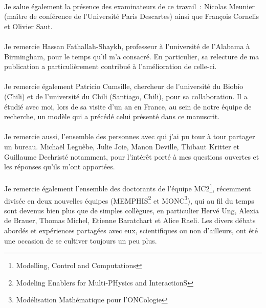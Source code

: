 \paragraph{}
Je salue également la présence des examinateurs de ce travail~: Nicolas Meunier (maître de conférence de l'Université Paris Descartes) ainsi que François Cornelis et Olivier Saut. 


\paragraph{}
Je remercie Hassan Fathallah-Shaykh, professeur à l'université de l'Alabama à Birmingham, pour le temps qu'il m'a consacré. En particulier, sa relecture de ma publication a particulièrement contribué à l'amélioration de celle-ci.

\paragraph{}
Je remercie également Patricio Cumsille, chercheur de l'université du Biobío (Chili) et de l'université du Chili (Santiago, Chili), pour sa collaboration. Il a étudié avec moi, lors de sa visite d'un an en France, au sein de notre équipe de recherche, un modèle qui a précédé celui présenté dans ce manuscrit. 

\paragraph{}
Je remercie aussi, l'ensemble des personnes avec qui j'ai pu tour à tour partager un bureau. Michaël Leguèbe, Julie Joie, Manon Deville, Thibaut Kritter et Guillaume Dechristé notamment, pour l'intérêt porté à mes questions ouvertes et les réponses qu'ils m'ont apportées. 

\paragraph{}
Je remercie également l'ensemble des doctorants de l'équipe MC2\footnote{Modelling, Control and Computations}, récemment divisée en deux nouvelles équipes (MEMPHIS\footnote{Modeling Enablers for Multi-PHysics and InteractionS} et MONC\footnote{Modélisation Mathématique pour l'ONCologie}), qui au fil du temps sont devenus bien plus que de simples collègues, en particulier Hervé Ung, Alexia de Brauer, Thomas Michel, Etienne Baratchart et Alice Raeli. Les divers débats abordés et expériences partagées avec eux, scientifiques ou non d'ailleurs, ont été une occasion de se cultiver toujours un peu plus.

